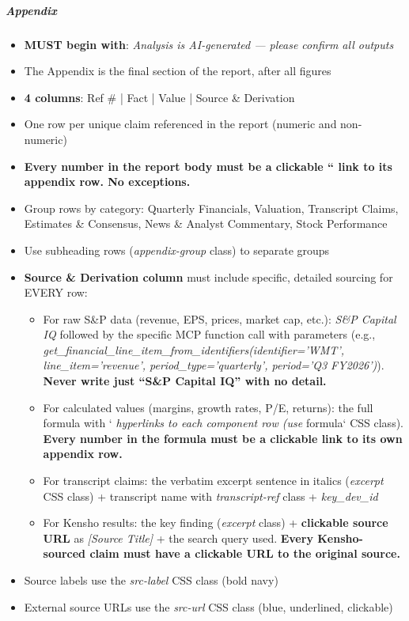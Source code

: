\documentclass[11pt]{article}
\begin{document}
\subparagraph{Appendix}\mbox{}\par
\begin{itemize}[leftmargin=*,itemsep=2pt,topsep=2pt]
\item {} \textbf{MUST begin with}: \emph{Analysis is AI-generated — please confirm all outputs}
\item {} The Appendix is the final section of the report, after all figures
\item {} \textbf{4 columns}: Ref \# | Fact | Value | Source \& Derivation
\item {} One row per unique claim referenced in the report (numeric and non-numeric)
\item {} \textbf{Every number in the report body must be a clickable `` link to its appendix row. No exceptions.}
\item {} Group rows by category: Quarterly Financials, Valuation, Transcript Claims, Estimates \& Consensus, News \& Analyst Commentary, Stock Performance
\item {} Use subheading rows (\emph{appendix-group} class) to separate groups
\item {} \textbf{Source \& Derivation column} must include specific, detailed sourcing for EVERY row:
\begin{itemize}[leftmargin=*,itemsep=2pt,topsep=2pt]
\item {} For raw S\&P data (revenue, EPS, prices, market cap, etc.): \emph{S\&P Capital IQ} followed by the specific MCP function call with parameters (e.g., \emph{get\_\allowbreak{}financial\_\allowbreak{}line\_\allowbreak{}item\_\allowbreak{}from\_\allowbreak{}identifiers(identifier='WMT', line\_\allowbreak{}item='revenue', period\_\allowbreak{}type='quarterly', period='Q3 FY2026')}). \textbf{Never write just ``S\&P Capital IQ'' with no detail.}
\item {} For calculated values (margins, growth rates, P/E, returns): the full formula with `\emph{ hyperlinks to each component row (use }formula` CSS class). \textbf{Every number in the formula must be a clickable link to its own appendix row.}
\item {} For transcript claims: the verbatim excerpt sentence in italics (\emph{excerpt} CSS class) + transcript name with \emph{transcript-ref} class + \emph{key\_\allowbreak{}dev\_\allowbreak{}id}
\item {} For Kensho results: the key finding (\emph{excerpt} class) + \textbf{clickable source URL} as \emph{[Source Title]} + the search query used. \textbf{Every Kensho-sourced claim must have a clickable URL to the original source.}
\end{itemize}
\item {} Source labels use the \emph{src-label} CSS class (bold navy)
\item {} External source URLs use the \emph{src-url} CSS class (blue, underlined, clickable)
\end{itemize}
\end{document}
